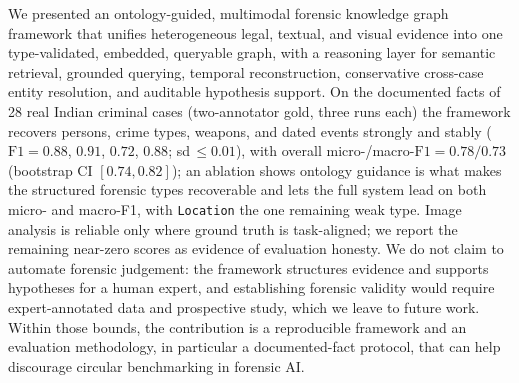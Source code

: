 \documentclass[conference]{IEEEtran}
\newcommand{\node}[1]{\texttt{#1}}
\begin{document}
We presented an ontology-guided, multimodal forensic knowledge graph framework
that unifies heterogeneous legal, textual, and visual evidence into one
type-validated, embedded, queryable graph, with a reasoning layer for semantic
retrieval, grounded querying, temporal reconstruction, conservative
cross-case entity resolution, and auditable hypothesis support. On the documented
facts of 28 real Indian criminal cases (two-annotator gold, three runs each) the
framework recovers persons, crime types, weapons, and dated events strongly and
stably ($\mathrm{F1}=0.88$, $0.91$, $0.72$, $0.88$; sd\,$\le0.01$), with overall
micro-/macro-$\mathrm{F1}=0.78/0.73$ (bootstrap CI $[0.74,0.82]$); an ablation shows
ontology guidance is what makes the structured forensic types recoverable and lets
the full system lead on both micro- and macro-F1, with \node{Location} the one
remaining weak type. Image
analysis is reliable only where ground truth is task-aligned; we report the
remaining near-zero scores as evidence of evaluation honesty. We do not claim to
automate forensic judgement: the framework structures evidence and supports
hypotheses for a human expert, and establishing forensic validity would require
expert-annotated data and prospective study, which we leave to future work. Within
those bounds, the contribution is a reproducible framework and an evaluation
methodology, in particular a documented-fact protocol, that can help discourage
circular benchmarking in forensic AI.




\appendix
\label{sec:appendix}
\end{document}

